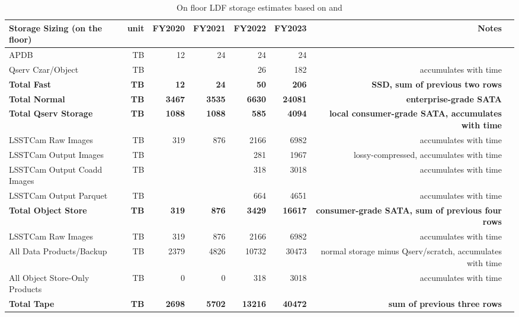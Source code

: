 \tiny \begin{longtable} { |p{}  |r  |r  |r  |r  |r  |r  |r |} 
\caption{On floor LDF storage estimates based on  and 
 \label{tab:storageFloor}}\\ 
\hline 
\textbf{Storage Sizing (on the floor)}&\textbf{unit}&\textbf{FY2020}&\textbf{FY2021}&\textbf{FY2022}&\textbf{FY2023}&\textbf{Notes} \\ \hline
{APDB}&{TB}&{12}&{24}&{24}&{24}& \\ \hline
{Qserv Czar/Object}&{TB}&{}&{}&{26}&{182}&{accumulates with time} \\ \hline
\textbf{Total Fast}&\textbf{TB}&\textbf{12}&\textbf{24}&\textbf{50}&\textbf{206}&\textbf{SSD, sum of previous two rows} \\ \hline
\textbf{Total Normal}&\textbf{TB}&\textbf{3467}&\textbf{3535}&\textbf{6630}&\textbf{24081}&\textbf{enterprise-grade SATA} \\ \hline
\textbf{Total Qserv Storage}&\textbf{TB}&\textbf{1088}&\textbf{1088}&\textbf{585}&\textbf{4094}&\textbf{local consumer-grade SATA, accumulates with time} \\ \hline
{LSSTCam Raw Images}&{TB}&{319}&{876}&{2166}&{6982}&{accumulates with time} \\ \hline
{LSSTCam Output Images}&{TB}&{}&{}&{281}&{1967}&{lossy-compressed, accumulates with time} \\ \hline
{LSSTCam Output Coadd Images}&{TB}&{}&{}&{318}&{3018}&{accumulates with time} \\ \hline
{LSSTCam Output Parquet}&{TB}&{}&{}&{664}&{4651}&{accumulates with time} \\ \hline
\textbf{Total Object Store}&\textbf{TB}&\textbf{319}&\textbf{876}&\textbf{3429}&\textbf{16617}&\textbf{consumer-grade SATA, sum of previous four rows} \\ \hline
{LSSTCam Raw Images}&{TB}&{319}&{876}&{2166}&{6982}&{accumulates with time} \\ \hline
{All Data Products/Backup}&{TB}&{2379}&{4826}&{10732}&{30473}&{normal storage minus Qserv/scratch, accumulates with time} \\ \hline
{All Object Store-Only Products}&{TB}&{0}&{0}&{318}&{3018}&{accumulates with time} \\ \hline
\textbf{Total Tape}&\textbf{TB}&\textbf{2698}&\textbf{5702}&\textbf{13216}&\textbf{40472}&\textbf{sum of previous three rows} \\ \hline
\end{longtable} \normalsize
